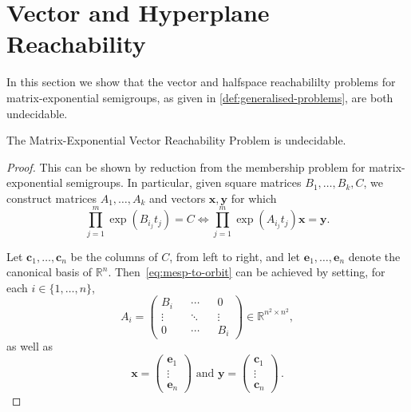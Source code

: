 \documentclass[format=acmsmall, review=false, screen=true]{acmart}
\newcommand{\Reals}{\mathbb{R}}
\newcommand{\myvector}{\boldsymbol}
\begin{document}
\section{Vector and Hyperplane Reachability}

In this section we show that the vector and halfspace reachabililty
problems for matrix-exponential semigroups, as given in
\cref{def:generalised-problems}, are both undecidable.

\begin{theorem}
The Matrix-Exponential Vector Reachability Problem is undecidable.
\end{theorem}

\begin{proof}
This can be shown by reduction from the membership problem for
matrix-exponential semigroups. In particular, given square matrices
$B_{1}, \ldots, B_{k}, C$, we construct matrices $A_{1}, \ldots,
A_{k}$ and vectors $\myvector{x}, \myvector{y}$ for which
\begin{equation}
  \label{eq:mesp-to-orbit}
  \prod \limits_{j=1}^{m} \exp(B_{i_{j}} t_{j}) = C \Leftrightarrow
  \prod \limits_{j=1}^{m} \exp(A_{i_{j}} t_{j}) \myvector{x} = \myvector{y} .
\end{equation}

Let $\myvector{c}_{1}, \ldots, \myvector{c}_{n}$ be the columns of
$C$, from left to right, and let $\myvector{e}_{1}, \ldots,
\myvector{e}_{n}$ denote the canonical basis of
$\Reals^{n}$. Then~\eqref{eq:mesp-to-orbit} can be achieved by
setting, for each $i \in \lbrace 1, \ldots, n \rbrace$,
\begin{equation*}
A_{i} =
\begin{pmatrix}
B_{i} && \cdots && 0 \\
\vdots && \ddots && \vdots \\
0 && \cdots && B_{i}
\end{pmatrix} \in \Reals^{n^{2} \times n^{2}},
\end{equation*}
as well as
\begin{equation*}
\myvector{x} = \begin{pmatrix} \myvector{e}_{1} \\ \vdots \\ \myvector{e}_{n} \end{pmatrix} \mbox{ and }
\myvector{y} = \begin{pmatrix} \myvector{c}_{1} \\ \vdots \\ \myvector{c}_{n} \end{pmatrix} \, .
\end{equation*}
\end{proof}
\end{document}
